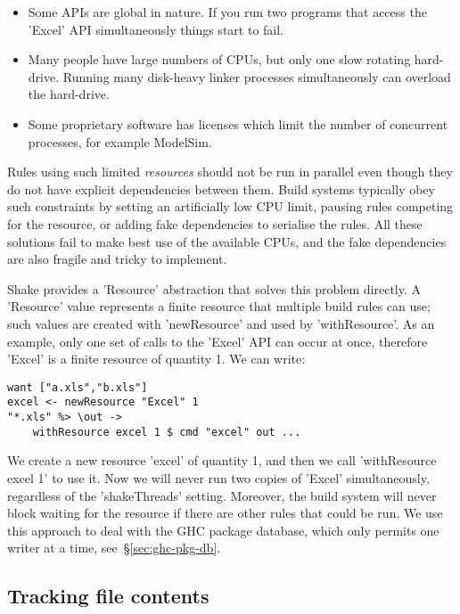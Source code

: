 \begin{itemize}
\item Some APIs are global in nature. If you run two programs that access the
\lst'Excel' API simultaneously things start to fail.
\item Many people have large numbers of CPUs, but only one slow rotating
hard-drive. Running many disk-heavy linker processes simultaneously can overload
the hard-drive.
\item Some proprietary software has licenses which limit the number of
concurrent processes, for example ModelSim.
\end{itemize}

Rules using such limited \emph{resources} should not be run in
parallel even though they do not have explicit dependencies between them. Build systems
typically obey such constraints by setting an artificially low CPU limit, pausing rules
competing for the resource, or adding fake dependencies to serialise the rules.
All these solutions fail to make best use of the available CPUs, and the fake
dependencies are also fragile and tricky to implement.

Shake provides a \lst'Resource' abstraction that solves this problem directly.
A \lst'Resource' value represents a finite resource that multiple build rules can use;
such values are created with \lst'newResource' and used by \lst'withResource'. As an
example, only one set of calls to the \lst'Excel' API can occur at once, therefore
\lst'Excel' is a finite resource of quantity 1. We can write:

\begin{lstlisting}
want ["a.xls","b.xls"]
excel <- newResource "Excel" 1
"*.xls" %> \out ->
    withResource excel 1 $ cmd "excel" out ...
\end{lstlisting}

\noindent We create a new resource \lst'excel' of quantity 1, and then we call
\lst'withResource excel 1' to use it. Now we will never run two copies of
\lst'Excel' simultaneously, regardless of the \lst'shakeThreads' setting.
Moreover, the build system will never block waiting for the resource if there
are other rules that could be run. We use this approach to deal with the GHC
package database, which only permits one writer at a time,
see~\S\ref{sec:ghc-pkg-db}.

\subsection{Tracking file contents\label{sec:file-contents}}

